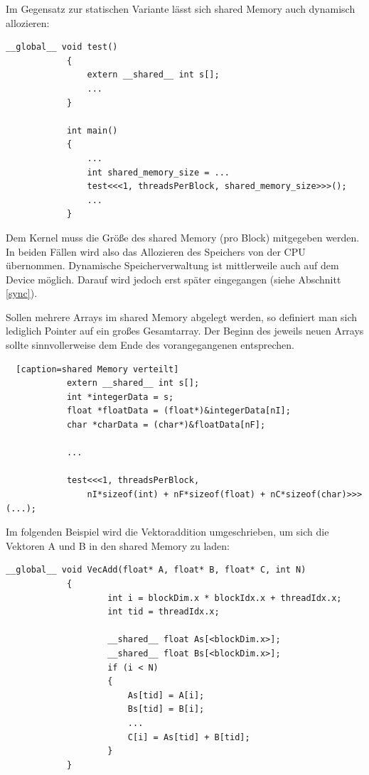 		Im Gegensatz zur statischen Variante lässt sich \gls{shared Memory} auch dynamisch allozieren:  		
  		\begin{lstlisting}[caption=shared Memory dynamisch]
			__global__ void test()
			{
  				extern __shared__ int s[];
  				...
			}
			
			int main()
			{
				...
				int shared_memory_size = ...
				test<<<1, threadsPerBlock, shared_memory_size>>>();
				...
			}			
  		\end{lstlisting}
  		
        Dem \Gls{Kernel} muss die Größe des \gls{shared Memory} (pro \Gls{Block}) mitgegeben werden. In beiden Fällen wird also das Allozieren des Speichers von der CPU übernommen.  Dynamische Speicherverwaltung ist mittlerweile auch auf dem Device möglich. Darauf wird jedoch erst später eingegangen (siehe Abschnitt \ref{sync}). 
        
        Sollen mehrere Arrays im \gls{shared Memory} abgelegt werden, so definiert man sich lediglich Pointer auf ein großes Gesamtarray. Der Beginn des jeweils neuen Arrays sollte sinnvollerweise dem Ende des vorangegangenen entsprechen.  	  		
  		\begin{lstlisting}	[caption=shared Memory verteilt]	
			extern __shared__ int s[];
			int *integerData = s;                        
			float *floatData = (float*)&integerData[nI];
			char *charData = (char*)&floatData[nF];
			
			...
			
			test<<<1, threadsPerBlock, 
				nI*sizeof(int) + nF*sizeof(float) + nC*sizeof(char)>>>(...);
		\end{lstlisting}

		Im folgenden Beispiel wird die Vektoraddition umgeschrieben, um sich die Vektoren A und B in den \gls{shared Memory} zu laden:	
		
		\begin{lstlisting}[caption=Vektoraddition shared Memory]
			__global__ void VecAdd(float* A, float* B, float* C, int N)
			{
    			    int i = blockDim.x * blockIdx.x + threadIdx.x;
    			    int tid = threadIdx.x;
    			
    			    __shared__ float As[<blockDim.x>];
    			    __shared__ float Bs[<blockDim.x>]; 			
    			    if (i < N)
    			    {
    			        As[tid] = A[i];
    			        Bs[tid] = B[i];  
    			        ...	    
        			    C[i] = As[tid] + B[tid];
        		    }
			}
		\end{lstlisting}
		
